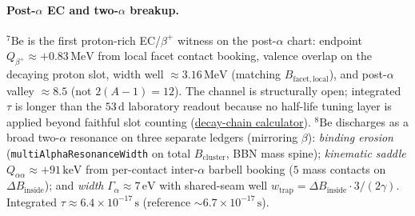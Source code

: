 \documentclass[11pt,notitlepage]{amsart}
\begin{document}
\paragraph{Post-$\alpha$ EC and two-$\alpha$ breakup.}
$^7\mathrm{Be}$ is the first proton-rich EC/$\beta^+$ witness on the post-$\alpha$ chart:
endpoint $Q_{\beta^+}\approx +0.83\,\mathrm{MeV}$ from local facet contact booking,
valence overlap on the decaying proton slot, width well $\approx 3.16\,\mathrm{MeV}$
(matching $B_{\mathrm{facet,local}}$), and post-$\alpha$ valley $\approx 8.5$
(not $2(A{-}1)=12$). The channel is structurally open; integrated $\tau$ is longer than
the $53\,\mathrm{d}$ laboratory readout because no half-life tuning layer is applied
beyond faithful slot counting (\hyperref[script:decay-chain]{decay-chain calculator}).
$^8\mathrm{Be}$ discharges as a broad two-$\alpha$ resonance on three separate
ledgers (mirroring $\beta$): \emph{binding erosion}
(\texttt{multiAlphaResonanceWidth} on total $B_{\mathrm{cluster}}$, BBN mass spine);
\emph{kinematic saddle} $Q_{\alpha\alpha}\approx +91\,\mathrm{keV}$ from per-contact
inter-$\alpha$ barbell booking ($5$ mass contacts on $\Delta B_{\mathrm{inside}}$);
and \emph{width} $\Gamma_\alpha\approx 7\,\mathrm{eV}$ with shared-seam well
$w_{\mathrm{trap}}=\Delta B_{\mathrm{inside}}\cdot 3/(2\gamma)$.
Integrated $\tau\approx 6.4\times 10^{-17}\,\mathrm{s}$
(reference $\sim 6.7\times 10^{-17}\,\mathrm{s}$).
\end{document}
